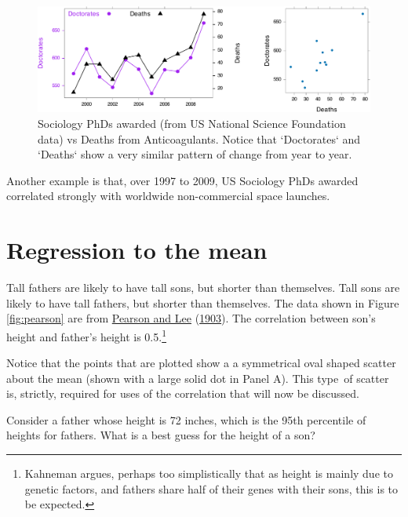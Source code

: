 \documentclass[
  10pt,
  b5paper]{book}
\begin{document}
\begin{figure}

{\centering \includegraphics[width=1\linewidth]{07-regress_files/figure-latex/socAnti-1} 

}

\caption{Sociology PhDs awarded (from US National Science 
Foundation data) vs Deaths from Anticoagulants.  Notice
that `Doctorates` and `Deaths` show a very similar pattern
of change from year to year.
}\label{fig:socAnti}
\end{figure}

Another example is that, over 1997 to 2009, US Sociology PhDs awarded
correlated strongly with worldwide non-commercial space launches.

\hypertarget{regression-to-the-mean}{%
\section{Regression to the mean}\label{regression-to-the-mean}}

Tall fathers are likely to have tall sons, but shorter than themselves.
Tall sons are likely to have tall fathers, but shorter than themselves.
The data shown in Figure \ref{fig:pearson} are from \protect\hyperlink{ref-pearson1903laws}{Pearson and Lee} (\protect\hyperlink{ref-pearson1903laws}{1903}).
The correlation between son's height and father's height is
0.5.\footnote{Kahneman argues, perhaps too simplistically that as height is
  mainly due to genetic factors, and fathers share half of their genes
  with their sons, this is to be expected.}

Notice that the points that are plotted show a a symmetrical oval shaped
scatter about the mean (shown with a large solid dot in Panel A). This
type~of scatter is, strictly, required for uses of the correlation that
will now be discussed.

Consider a father whose height is 72 inches, which is the 95th percentile
of heights for fathers. What is a best guess for the height of a son?
\end{document}
